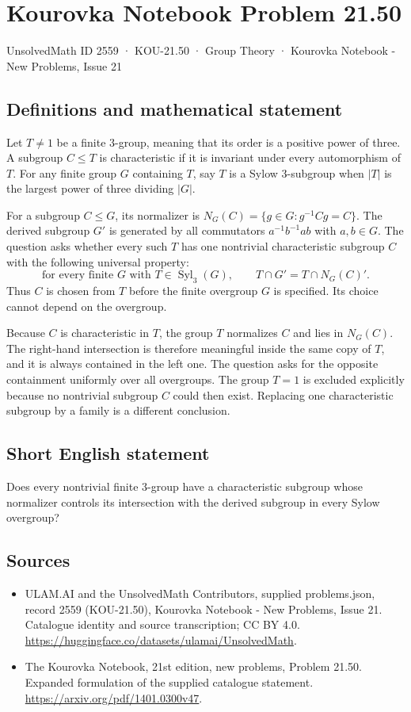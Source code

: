 \documentclass[11pt,a4paper]{article}
\begin{document}
\section*{Kourovka Notebook Problem 21.50}\label{2559}
{\small UnsolvedMath ID 2559 · KOU-21.50 · Group Theory · Kourovka Notebook - New Problems, Issue 21}
\subsection{Definitions and mathematical statement}
Let $T\ne1$ be a finite $3$-group, meaning that its order is a positive
power of three. A subgroup $C\le T$ is characteristic if it is invariant
under every automorphism of $T$. For any finite group $G$ containing
$T$, say $T$ is a Sylow $3$-subgroup when $|T|$ is the largest power
of three dividing $|G|$.

For a subgroup $C\le G$, its normalizer is
$N_G(C)=\{g\in G:g^{-1}Cg=C\}$. The derived subgroup $G'$ is generated
by all commutators $a^{-1}b^{-1}ab$ with $a,b\in G$.
The question asks whether every such $T$ has one nontrivial characteristic
subgroup $C$ with the following universal property:
\[
 \text{for every finite }G\text{ with }T\in\operatorname{Syl}_3(G),
 \qquad T\cap G'=T\cap N_G(C)'.
\]
Thus $C$ is chosen from $T$ before the finite overgroup $G$ is specified.
Its choice cannot depend on the overgroup.

Because $C$ is characteristic in $T$, the group $T$ normalizes $C$ and
lies in $N_G(C)$. The right-hand intersection is therefore meaningful
inside the same copy of $T$, and it is always contained in the left
one. The question asks for the opposite containment uniformly over
all overgroups. The group $T=1$ is excluded explicitly because no
nontrivial subgroup $C$ could then exist. Replacing one characteristic
subgroup by a family is a different conclusion.
\subsection{Short English statement}
Does every nontrivial finite $3$-group have a characteristic subgroup whose normalizer controls its intersection with the derived subgroup in every Sylow overgroup?
\subsection{Sources}
\begin{itemize}
\item[S1] ULAM.AI and the UnsolvedMath Contributors, supplied problems.json, record 2559 (KOU-21.50), Kourovka Notebook - New Problems, Issue 21. Catalogue identity and source transcription; CC BY 4.0.
\url{https://huggingface.co/datasets/ulamai/UnsolvedMath}.
\item[S2] The Kourovka Notebook, 21st edition, new problems, Problem 21.50. Expanded formulation of the supplied catalogue statement.
\url{https://arxiv.org/pdf/1401.0300v47}.
\end{itemize}
\end{document}
